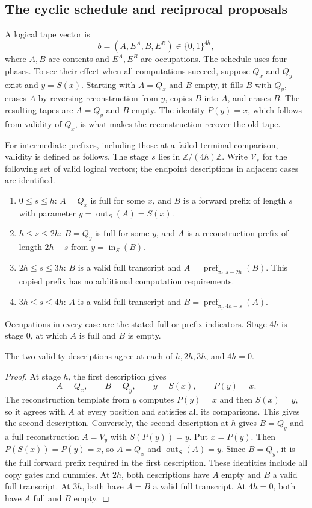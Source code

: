 \subsection{The cyclic schedule and reciprocal proposals}
\label{macro:schedule}

A logical tape vector is
\[
 b=(A,E^A,B,E^B)\in\{0,1\}^{4h},
\]
where $A,B$ are contents and $E^A,E^B$ are occupations.  The schedule
uses four phases.  To see their effect when all computations succeed,
suppose $Q_x$ and $Q_y$ exist and $y=S(x)$.  Starting with $A=Q_x$
and $B$ empty, it fills $B$ with $Q_y$, erases $A$ by reversing
reconstruction from $y$, copies $B$ into $A$, and erases $B$.
The resulting tapes are $A=Q_y$ and $B$ empty.  The identity
$P(y)=x$, which follows from validity of $Q_x$, is what makes the
reconstruction recover the old tape.

For intermediate prefixes, including those at a failed terminal
comparison, validity is defined as follows.  The stage $s$ lies in
$\mathbb Z/(4h)\mathbb Z$.  Write $\mathcal V_s$ for the following
set of valid logical vectors; the endpoint descriptions in adjacent
cases are identified.
\begin{enumerate}[label=\textup{(\roman*)}]
 \item $0\le s\le h$: $A=Q_x$ is full for some $x$, and $B$ is a
 forward prefix of length $s$ with parameter
 $y=\operatorname{out}_S(A)=S(x)$.
 \item $h\le s\le2h$: $B=Q_y$ is full for some $y$, and $A$ is a
 reconstruction prefix of length $2h-s$ from
 $y=\operatorname{in}_S(B)$.
 \item $2h\le s\le3h$: $B$ is a valid full transcript and
 $A=\operatorname{pref}_{\pi_{\mathrm f},s-2h}(B)$.
 This copied prefix has no additional computation requirements.
 \item $3h\le s\le4h$: $A$ is a valid full transcript and
 $B=\operatorname{pref}_{\pi_{\mathrm f},4h-s}(A)$.
\end{enumerate}
Occupations in every case are the stated full or prefix indicators.
Stage $4h$ is stage $0$, at which $A$ is full and $B$ is empty.

\begin{lemma}\label{macro:boundaries}
The two validity descriptions agree at each of $h,2h,3h$, and $4h=0$.
\end{lemma}

\begin{proof}
At stage $h$, the first description gives
\[
 A=Q_x,\qquad B=Q_y,\qquad y=S(x),\qquad P(y)=x.
\]
The reconstruction template from $y$ computes $P(y)=x$ and then
$S(x)=y$, so it agrees with $A$ at every position and satisfies all
its comparisons.  This gives the second description.  Conversely,
the second description at $h$ gives $B=Q_y$ and a full reconstruction
$A=V_y$ with $S(P(y))=y$.  Put $x=P(y)$.  Then
$P(S(x))=P(y)=x$, so $A=Q_x$ and $\operatorname{out}_S(A)=y$.
Since $B=Q_y$, it is the full forward prefix required in the first
description.  These identities include all copy gates and dummies.
At $2h$, both descriptions have $A$ empty and $B$ a valid full
transcript.  At $3h$, both have $A=B$ a valid full transcript.
At $4h=0$, both have $A$ full and $B$ empty.
\end{proof}

